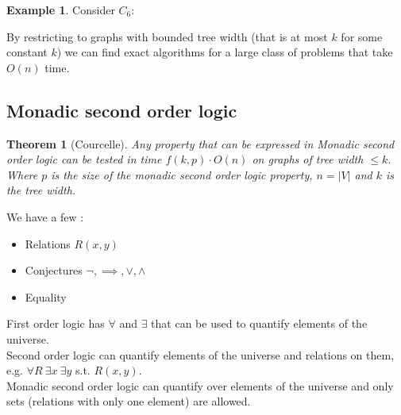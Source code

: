 \documentclass{article}
\newtheorem*{thm}{Theorem}
\theoremstyle{definition}
\newtheorem*{ex}{Example}
\begin{document}
\begin{ex}
Consider $C_6$:
\begin{center}
\end{center}
\end{ex}

By restricting to graphs with bounded tree width (that is at most $k$ for some constant $k$) we can find exact algorithms for a large class of problems that take $O(n)$ time.


\subsection{Monadic second order logic}

\begin{thm}[Courcelle]
Any property that can be expressed in Monadic second order logic can be tested in time $f(k,p)\cdot O(n)$ on graphs of tree width $\le k$.
Where $p$ is the size of the monadic second order logic property, $n = |V|$ and $k$ is the tree width.
\end{thm}

We have a few :
\begin{itemize}
\item Relations $R(x,y)$
\item Conjectures $\neg,\implies,\vee,\wedge$
\item Equality
\end{itemize}

First order logic has $\forall$ and $\exists$ that can be used to quantify elements of the universe.\\
Second order logic can quantify elements of the universe and relations on them, e.g. $\forall R\ \exists x\ \exists y$ s.t. $R(x,y)$. \\
Monadic second order logic can quantify over elements of the universe and only sets (relations with only one element) are allowed.

\end{document}
